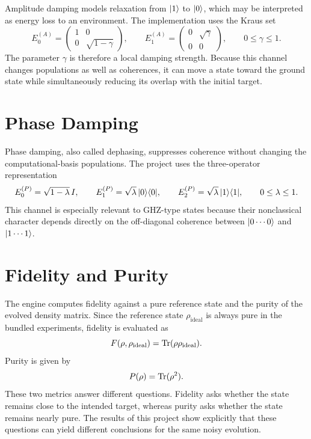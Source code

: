 Amplitude damping models relaxation from $\lvert 1 \rangle$ to $\lvert 0 \rangle$, which may be interpreted as energy loss to an environment. The implementation uses the Kraus set
\begin{equation}
E_0^{(A)} =
\begin{pmatrix}
1 & 0 \\
0 & \sqrt{1-\gamma}
\end{pmatrix},
\qquad
E_1^{(A)} =
\begin{pmatrix}
0 & \sqrt{\gamma} \\
0 & 0
\end{pmatrix},
\qquad 0 \le \gamma \le 1.
\label{eq:amp_kraus}
\end{equation}
The parameter $\gamma$ is therefore a local damping strength. Because this channel changes populations as well as coherences, it can move a state toward the ground state while simultaneously reducing its overlap with the initial target.

\section{Phase Damping}

Phase damping, also called dephasing, suppresses coherence without changing the computational-basis populations. The project uses the three-operator representation
\begin{equation}
E_0^{(P)} = \sqrt{1-\lambda}\,I,
\qquad
E_1^{(P)} = \sqrt{\lambda}\,\lvert 0 \rangle\langle 0 \rvert,
\qquad
E_2^{(P)} = \sqrt{\lambda}\,\lvert 1 \rangle\langle 1 \rvert,
\qquad 0 \le \lambda \le 1.
\label{eq:phase_kraus}
\end{equation}
This channel is especially relevant to GHZ-type states because their nonclassical character depends directly on the off-diagonal coherence between $\lvert 0\cdots 0 \rangle$ and $\lvert 1\cdots 1 \rangle$.

\section{Fidelity and Purity}

The engine computes fidelity against a pure reference state and the purity of the evolved density matrix. Since the reference state $\rho_{\mathrm{ideal}}$ is always pure in the bundled experiments, fidelity is evaluated as
\begin{equation}
F(\rho,\rho_{\mathrm{ideal}}) = \operatorname{Tr}(\rho \rho_{\mathrm{ideal}}).
\label{eq:fidelity}
\end{equation}
Purity is given by
\begin{equation}
P(\rho) = \operatorname{Tr}(\rho^2).
\label{eq:purity}
\end{equation}
These two metrics answer different questions. Fidelity asks whether the state remains close to the intended target, whereas purity asks whether the state remains nearly pure. The results of this project show explicitly that these questions can yield different conclusions for the same noisy evolution.
